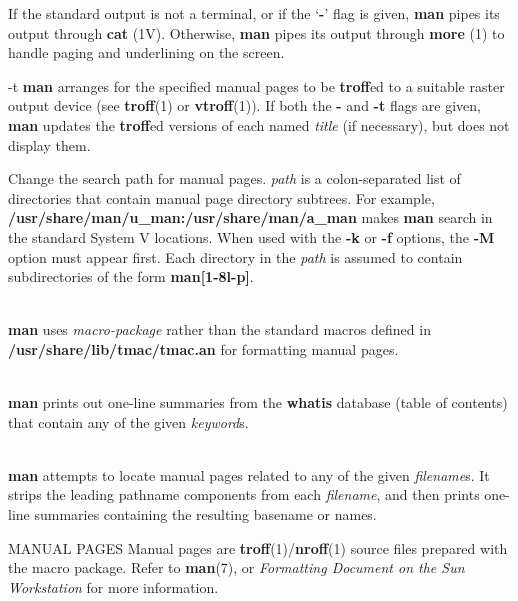\begin{manpage}
\begin{description}
If the standard output is not a terminal, or if the `{\bf -}'
flag is given, {\bf man} pipes its output through {\bf cat} (1V).
Otherwise, {\bf man} pipes its output through {\bf more} (1)
to handle paging and underlining on the screen.
\end{description}
\begin{options}\begin{optionlist}
  \item[-t]{\bf man} arranges for the specified manual pages to be
        {\bf troff}ed to a suitable raster output device (see {\bf
        troff}(1) or {\bf vtroff}(1)).  If both the {\bf -} and {\bf
        -t} flags are given, {\bf man} updates the {\bf troff}ed
        versions of each named {\it title} (if necessary), but does
        not display them. 
  \item[\arg{-M}{ path}]Change the search path for manual pages.
        {\it path} is a colon-separated list of directories that
        contain manual page directory subtrees.  For example,\\ 
        {\bf/usr/share/man/u\_man:/usr/share/man/a\_man} makes {\bf man}
        search in the standard System V locations.  When used with the
        {\bf -k} or {\bf -f} options, the {\bf -M} option must appear
        first.  Each directory in the {\it path} is assumed to contain
        subdirectories of the form {\bf man[1-8l-p]}.
  \item[\arg{-T}{ macro-package}]\ \\{\bf man} uses {\it macro-package}
        rather than the standard  macros defined in {\bf
        /usr/share/lib/tmac/tmac.an} for formatting manual pages.
  \item[\arg{-k}{ keyword\ldots{}}]\ \\{\bf man} prints out one-line
        summaries from the {\bf whatis} database (table of contents)
        that contain any of the given {\it keyword}s.
  \item[\arg{-f}{ filename \ldots{}}]\ \\{\bf man} attempts to locate
        manual pages related to any of the given {\it filename}s.  It
        strips the leading pathname components from each {\it
        filename}, and then prints one-line summaries containing the
        resulting basename or names.
\end{optionlist}\end{options}
\begin{manblock}{MANUAL PAGES}
Manual pages are {\bf troff}(1)/{\bf nroff}(1) source files prepared
with the  macro package.  Refer to {\bf man}(7), or {\it
Formatting Document on the Sun Workstation} for more information.


\end{manblock}
\end{manpage}

